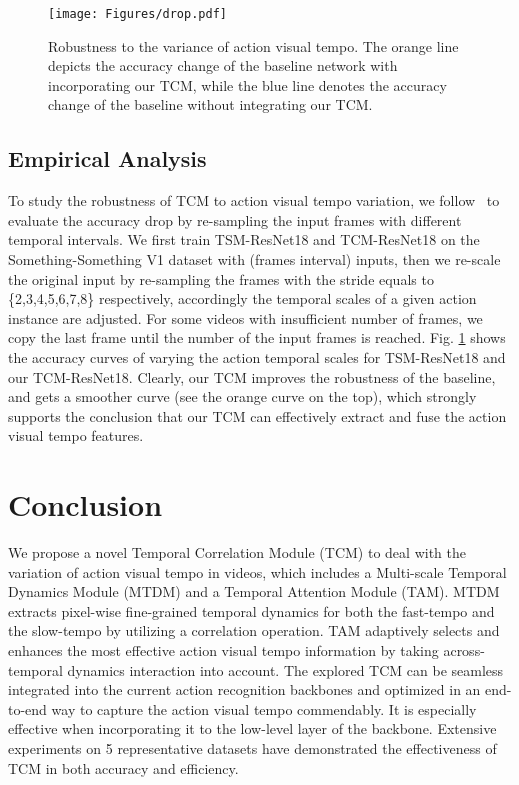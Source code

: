 \documentclass[journal]{IEEEtran}
\begin{document}
\begin{figure}[!htbp]
  \texttt{[image: Figures/drop.pdf]}
  \caption{Robustness to the variance of action visual tempo. The orange line depicts the accuracy change of the baseline network with incorporating our TCM, while the blue line denotes the accuracy change of the baseline without integrating our TCM.}
  \label{fig:drop}
\end{figure}

\subsection{Empirical Analysis}
To study the robustness of TCM to action visual tempo variation, we follow~\cite{yang2020temporal} to evaluate the accuracy drop by re-sampling the input frames with different temporal intervals. We first train TSM-ResNet18 and TCM-ResNet18 on the Something-Something V1 dataset with  (frames  interval) inputs, then we re-scale the original  input by re-sampling the frames with the stride  equals to \{2,3,4,5,6,7,8\} respectively, accordingly the temporal scales of a given action instance are adjusted. For some videos with insufficient number of frames, we copy the last frame until the number of the input frames is reached. Fig. \ref{fig:drop} shows the accuracy curves of varying the action temporal scales for TSM-ResNet18 and our TCM-ResNet18. Clearly, our TCM improves the robustness of the baseline, and gets a smoother curve (see the orange curve on the top), which strongly supports the conclusion that our TCM can effectively extract and fuse the action visual tempo features.

\section{Conclusion}
We propose a novel Temporal Correlation Module (TCM) to deal with the variation of action visual tempo in videos, which includes a Multi-scale Temporal Dynamics Module (MTDM) and a Temporal Attention Module (TAM). MTDM extracts pixel-wise fine-grained temporal dynamics for both the fast-tempo and the slow-tempo by utilizing a correlation operation. TAM adaptively selects and enhances the most effective action visual tempo information by taking across-temporal dynamics interaction into account. The explored TCM can be seamless integrated into the current action recognition backbones and optimized in an end-to-end way to capture the action visual tempo commendably. It is especially effective when incorporating it to the low-level layer of the backbone. Extensive experiments on 5 representative datasets have demonstrated the effectiveness of TCM in both accuracy and efficiency.
\end{document}
